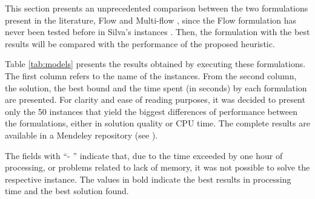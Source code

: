 \documentclass{ro}
\begin{document}
This section presents an unprecedented comparison between the two formulations present in the literature, Flow \cite{lyra2004problema} and Multi-flow \cite{silva2009problema}, since the Flow formulation has never been tested before in Silva's  instances \cite{silva2009problema}. Then, the formulation with the best results will be compared with the performance of the proposed heuristic.


Table \ref{tab:models} presents the results obtained by executing these formulations. The first column refers to the name of the instances. From the second column, the solution, the best bound and the time spent (in seconds) by each formulation are presented. For clarity and ease of reading purposes, it was decided to present only the 50 instances that yield the biggest differences of performance between the formulations, either in solution quality or CPU time. The complete results are available in a Mendeley repository (see \cite{pcctp-data-complete}).

The fields with ``- '' indicate that, due to the time exceeded by one hour of processing, or problems related to lack of memory, it was not possible to solve the respective instance. The values in bold indicate the best results in processing time and the best solution found.
\end{document}
